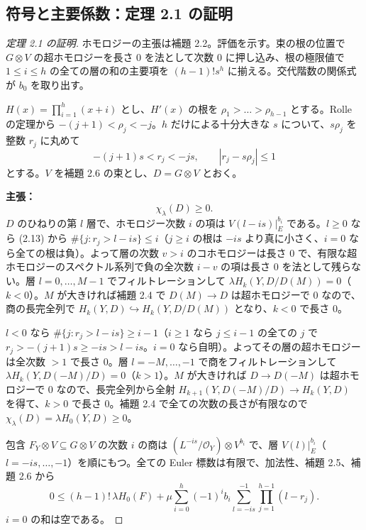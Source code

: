 \documentclass[11pt,a4paper]{ltjsarticle}
\theoremstyle{plain}
\theoremstyle{definition}
\newcommand{\cO}{\mathcal{O}}
\begin{document}
\subsection{符号と主要係数：定理 2.1 の証明}
\begin{proof}[定理 2.1 の証明]
ホモロジーの主張は補題 2.2。評価を示す。束の根の位置で $G\otimes V$ の超ホモロジーを長さ $0$ を法として次数 $0$ に押し込み、根の極限値で $1\le i\le h$ の全ての層の和の主要項を $(h-1)!s^h$ に揃える。交代階数の関係式が $b_0$ を取り出す。

$H(x) = \prod_{i=1}^h(x+i)$ とし、$H'(x)$ の根を $\rho_1>\dots>\rho_{h-1}$ とする。Rolle の定理から $-(j+1)<\rho_j<-j$。$h$ だけによる十分大きな $s$ について、$s\rho_j$ を整数 $r_j$ に丸めて
\begin{equation}\tag{2.13}
  -(j+1)s<r_j<-js,\qquad |r_j-s\rho_j|\le1
\end{equation}
とする。$V$ を補題 2.6 の束とし、$D = G\otimes V$ とおく。

\textbf{主張：}
\begin{equation}\tag{2.14}
  \chi_\lambda(D)\ge0.
\end{equation}
$D$ のひねりの第 $l$ 層で、ホモロジー次数 $i$ の項は $V(l-is)|_E^{b_i}$ である。$l\ge0$ なら (2.13) から $\#\{j: r_j>l-is\}\le i$（$j\ge i$ の根は $-is$ より真に小さく、$i = 0$ なら全ての根は負）。よって層の次数 $v>i$ のコホモロジーは長さ $0$ で、有限な超ホモロジーのスペクトル系列で負の全次数 $i-v$ の項は長さ $0$ を法として残らない。層 $l = 0,\dots,M-1$ でフィルトレーションして $\lambda H_k(Y,D/D(M)) = 0$（$k<0$）。$M$ が大きければ補題 2.4 で $D(M)\to D$ は超ホモロジーで $0$ なので、商の長完全列で $H_k(Y,D)\hookrightarrow H_k(Y,D/D(M))$ となり、$k<0$ で長さ $0$。

$l<0$ なら $\#\{j: r_j>l-is\}\ge i-1$（$i\ge1$ なら $j\le i-1$ の全ての $j$ で $r_j>-(j+1)s\ge-is>l-is$。$i = 0$ なら自明）。よってその層の超ホモロジーは全次数 $>1$ で長さ $0$。層 $l = -M,\dots,-1$ で商をフィルトレーションして $\lambda H_k(Y,D(-M)/D) = 0$（$k>1$）。$M$ が大きければ $D\to D(-M)$ は超ホモロジーで $0$ なので、長完全列から全射 $H_{k+1}(Y,D(-M)/D)\to H_k(Y,D)$ を得て、$k>0$ で長さ $0$。補題 2.4 で全ての次数の長さが有限なので $\chi_\lambda(D) = \lambda H_0(Y,D)\ge0$。

包含 $F_Y\otimes V\subseteq G\otimes V$ の次数 $i$ の商は $(L^{-is}/\cO_Y)\otimes V^{b_i}$ で、層 $V(l)|_E^{b_i}$（$l = -is,\dots,-1$）を順にもつ。全ての Euler 標数は有限で、加法性、補題 2.5、補題 2.6 から
\begin{equation}\tag{2.15}
  0\le(h-1)!\,\lambda H_0(F)+\mu\sum_{i=0}^h(-1)^ib_i\sum_{l=-is}^{-1}\prod_{j=1}^{h-1}(l-r_j).
\end{equation}
$i = 0$ の和は空である。


\end{proof}
\end{document}
